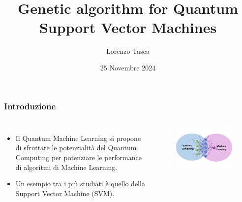 \documentclass{beamer}
\title[Genetic algorithm for QSVM] 
{Genetic algorithm for Quantum Support Vector Machines}
\author[Lorenzo Tasca]
{Lorenzo Tasca}
\date[25/11/2024] 
{25 Novembre 2024}
\begin{document}
\frame{\titlepage}

\begin{frame}
\frametitle{Introduzione}

\begin{columns}

  \begin{itemize}
    \item<1-> Il Quantum Machine Learning si propone di sfruttare le potenzialità del Quantum Computing per potenziare le performance di algoritmi di Machine Learning. 
    \item<2-> Un esempio tra i più studiati è quello della Support Vector Machine (SVM). 
  \end{itemize}
  
  \begin{figure}
    \includegraphics[width=\textwidth]{images/1.png}
   \end{figure}
  
  \end{columns}
  
\end{frame}
\end{document}
